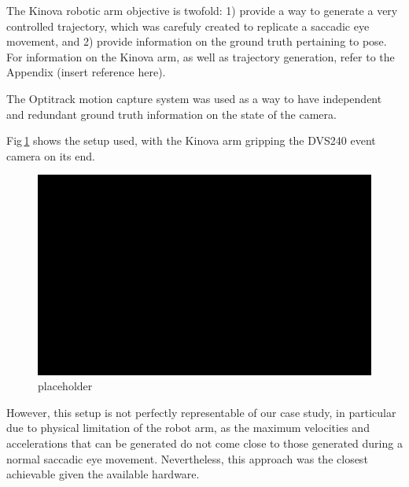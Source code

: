 \documentclass[10pt,twocolumn]{IEEEtran}
\begin{document}
The Kinova robotic arm objective is twofold: 1) provide a way to generate a very controlled trajectory, which was carefuly created to replicate a saccadic eye movement, and 2) provide information on the ground truth pertaining to pose. For information on the Kinova arm, as well as trajectory generation, refer to the Appendix (insert reference here). 

The Optitrack motion capture system was used as a way to have independent and redundant ground truth information on the state of the camera.

Fig\,\ref{fig:w13_kinova_setup} shows the setup used, with the Kinova arm gripping the DVS240 event camera on its end.

\begin{figure}[ht]
    \centering
    \includegraphics[width = 1\linewidth]{placeholder.png}
    \caption[]{placeholder}
    \label{fig:w13_kinova_setup}
\end{figure}

However, this setup is not perfectly representable of our case study, in particular due to physical limitation of the robot arm, as the maximum velocities and accelerations that can be generated do not come close to those generated during a normal saccadic eye movement. Nevertheless, this approach was the closest achievable given the available hardware.


%
%
\end{document}

